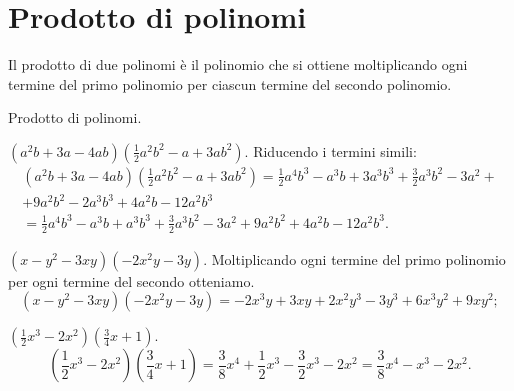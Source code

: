 \ovalbox{\risolvii \ref{ese:10.16}, \ref{ese:10.17}, \ref{ese:10.18}}

\section{Prodotto di polinomi}

Il prodotto di due polinomi è il polinomio che si ottiene
moltiplicando ogni termine del primo polinomio per ciascun termine del
secondo polinomio.

\begin{exrig}
 \begin{esempio}
 Prodotto di polinomi.

 \begin{enumeratea}
   \item $\left(a^{2}b+3a-4{ab}\right)\left(\frac{1}{2}a^{2}b^{2}-a+3{ab}^{2}\right).$ Riducendo i termini simili:
 \begin{multline*}
  \left(a^{2}b+3a-4{ab}\right)\left(\frac{1}{2}a^{2}b^{2}-a+3{ab}^{2}\right)=%
   \frac{1}{2}a^{4}b^{3}-a^{3}b+3a^{3}b^{3}+\frac{3}{2}a^{3}b^{2}-3a^{2}+\\
   +9a^{2}b^{2} -2a^{3}b^{3}+4a^{2}b-12a^{2}b^{3}\\
  =\frac{1}{2}a^{4}b^{3}-a^{3}b+a^{3}b^{3}+\frac{3}{2}a^{3}b^{2}-3a^{2}+9a^{2}b^{2}+4a^{2}b-12a^{2}b^{3}.
 \end{multline*}
 \item  $\left(x-y^{2}-3{xy}\right) \left(-2x^{2}y-3y\right).$
 Moltiplicando ogni termine del primo polinomio per ogni termine del
secondo otteniamo.
\[\left(x-y^{2}-3{xy}\right)\left(-2x^{2}y-3y\right)=-2x^{3}y+3{xy}+2x^{2}y^{3}-3y^{3}+6x^{3}y^{2}+9{xy}^{2};\]

 \item $\left(\frac{1}{2}x^{3}-2x^{2}\right)\left(\frac{3}{4}x+1\right)$.
 \[\left(\frac{1}{2}x^{3}-2x^{2}\right)\left(\frac{3}{4}x+1\right)=\frac{3}{8}x^{4}+\frac{1}{2}x^{3}-\frac{3}{2}x^{3}-2x^{2}=\frac{3}{8}x^{4}-x^{3}-2x^{2}.\]
 \end{enumeratea}
 \end{esempio}
\end{exrig}
\ovalbox{\risolvi \ref{ese:10.19}}
\newpage

\cleardoublepage
